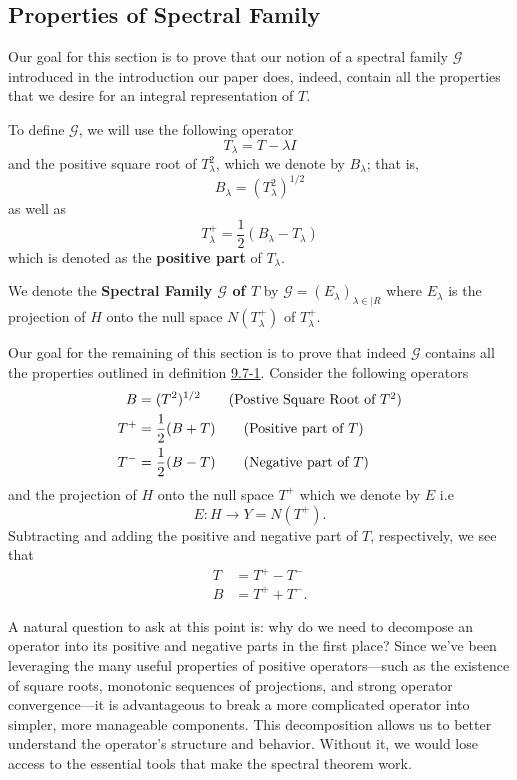 \subsection{Properties of Spectral Family}

Our goal for this section is to prove that our notion of a spectral family \( \mathcal{G} \) introduced in the introduction our paper does, indeed, contain all the properties that we desire for an integral representation of \( T  \).

To define \( \mathcal{G} \), we will use the following operator
\[  {T}_{\lambda} = T - \lambda I  \]
and the positive square root of \( {T}_{\lambda}^{2}  \), which we denote by \( {B}_{\lambda} \); that is,
\[  {B}_{\lambda} = ({T}_{\lambda}^{2})^{1/2} \]
as well as 
\[  {T}_{\lambda}^{+} = \frac{ 1 }{ 2 }  ({B}_{\lambda} - {T}_{\lambda}) \]
which is denoted as the \textbf{positive part} of \( {T}_{\lambda} \).

\begin{definition}
    We denote the \textbf{Spectral Family \( \mathcal{G} \) of \( T  \)} by \( \mathcal{G} = ({E}_{\lambda})_{\lambda \in |R } \) where \( {E}_{\lambda}  \) is the projection of \( H  \) onto the null space \( N({T}_{\lambda}^{+}) \) of \( {T}_{\lambda}^{+} \).
\end{definition}

Our goal for the remaining of this section is to prove that indeed \( \mathcal{G} \) contains all the properties outlined in definition {\hyperref[9.7-1]{9.7-1}}. Consider the following operators 
\begin{align*}
    B &= (T^{2})^{1/2} \tag{Postive Square Root of \( T^{2} \)} \\
    T^{+} &= \frac{ 1 }{ 2 } ( B +T ) \tag{Positive part of \( T  \)} \\
    T^{-}&= \frac{ 1 }{ 2 }  (B - T ) \tag{Negative part of \( T  \)}
\end{align*}
and the projection of \( H  \) onto the null space \( T^{+ } \) which we denote by \( E  \) i.e  
\[  E: H \to Y = N(T^{+}). \]
Subtracting and adding the positive and negative part of \( T  \), respectively, we see that 
\begin{align*}
    T &= T^{+ } - T^{-} \\
    B &= T^{+} + T^{-}.
\end{align*}

A natural question to ask at this point is: why do we need to decompose an operator into its positive and negative parts in the first place? Since we've been leveraging the many useful properties of positive operators—such as the existence of square roots, monotonic sequences of projections, and strong operator convergence—it is advantageous to break a more complicated operator into simpler, more manageable components. This decomposition allows us to better understand the operator’s structure and behavior. Without it, we would lose access to the essential tools that make the spectral theorem work.

